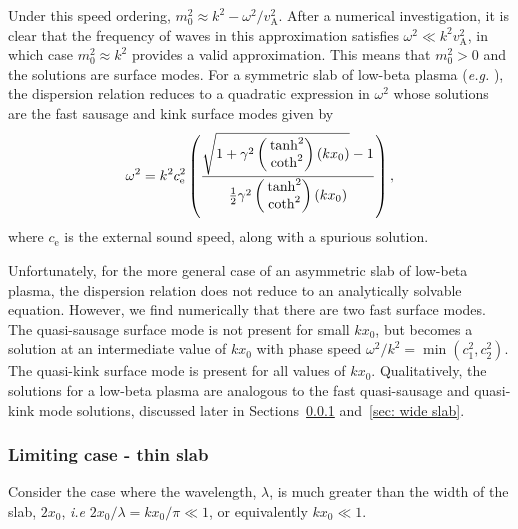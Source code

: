 Under this speed ordering, $m_0^2\approx{}k^2-\omega^2/v_\textrm{A}^2$. After a numerical investigation, it is clear that the frequency of waves in this approximation satisfies $\omega^2\ll{}k^2v_\textrm{A}^2$, in which case $m_0^2\approx k^2$ provides a valid approximation. This means that $m_0^2>0$ and the solutions are surface modes. For a symmetric slab of low-beta plasma (\textit{e.g.} \citealt{rob81b}), the dispersion relation reduces to a quadratic expression in $\omega^2$ whose solutions are the fast sausage and kink surface modes given by
\begin{equation}
\omega^2=k^2c_\textrm{e}^2\left(\frac{\sqrt{1+\gamma^2\left(\hspace{-0.11in}\begin{matrix}&\tanh^2 \\&\coth^2 \end{matrix}\right)(kx_0)}-1}{\frac{1}{2}\gamma^2\left(\hspace{-0.11in}\begin{matrix}&\tanh^2 \\&\coth^2 \end{matrix}\right)(kx_0)}\right),
\end{equation}
where $c_\textrm{e}$ is the external sound speed, along with a spurious solution.

Unfortunately, for the more general case of an asymmetric slab of low-beta plasma, the dispersion relation does not reduce to an analytically solvable equation. However, we find numerically that there are two fast surface modes. The quasi-sausage surface mode is not present for small $kx_0$, but becomes a solution at an intermediate value of $kx_0$ with phase speed $\omega^2/k^2=\min{(c_1^2,c_2^2)}$. The quasi-kink surface mode is present for all values of $kx_0$. Qualitatively, the solutions for a low-beta plasma are analogous to the fast quasi-sausage and quasi-kink mode solutions, discussed later in Sections~\ref{sec: thin slab} and~\ref{sec: wide slab}.


\subsubsection{Limiting case - thin slab} \label{sec: thin slab}

Consider the case where the wavelength, $\lambda$, is much greater than the width of the slab, $2x_0$, \textit{i.e} $2x_0/\lambda = kx_0/\pi \ll 1$, or equivalently $kx_0 \ll 1$.

